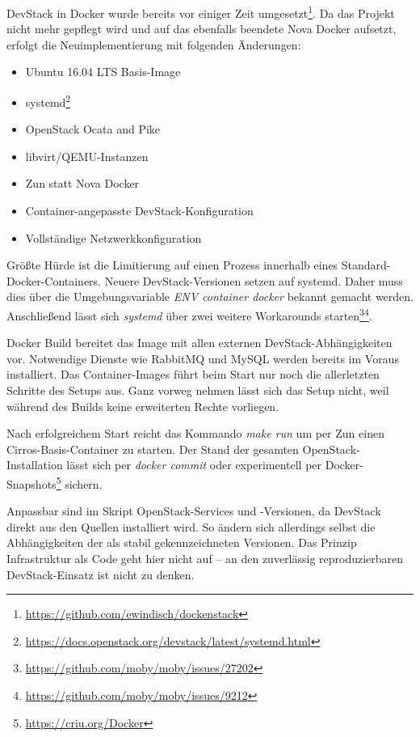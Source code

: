 \noindent DevStack in Docker wurde bereits vor einiger Zeit umgesetzt\footnote{\url{https://github.com/ewindisch/dockenstack}}. Da das Projekt nicht mehr gepflegt wird und auf das ebenfalls beendete Nova Docker aufsetzt, erfolgt die Neuimplementierung mit folgenden Änderungen:

\begin{itemize}
	
	\item Ubuntu 16.04 LTS Basis-Image
	\item systemd\footnote{\url{https://docs.openstack.org/devstack/latest/systemd.html}}
	\item OpenStack Ocata and Pike
	\item libvirt/QEMU-Instanzen
	\item Zun statt Nova Docker
	\item Container-angepasste DevStack-Konfiguration
	\item Vollständige Netzwerkkonfiguration
	
\end{itemize}


\noindent Größte Hürde ist die Limitierung auf einen Prozess innerhalb eines Standard-Docker-Containers. Neuere DevStack-Versionen setzen auf systemd. Daher muss dies über die Umgebungsvariable \emph{ENV container docker} bekannt gemacht werden. Anschließend lässt sich \emph{systemd} über zwei weitere Workarounds starten\footnote{\url{https://github.com/moby/moby/issues/27202}}\footnote{\url{https://github.com/moby/moby/issues/9212}}.

Docker Build bereitet das Image mit allen externen DevStack-Abhängigkeiten vor. Notwendige Dienste wie RabbitMQ und MySQL werden bereits im Voraus installiert. Das Container-Images führt beim Start nur noch die allerletzten Schritte des Setups aus. Ganz vorweg nehmen lässt sich das Setup nicht, weil während des Builds keine erweiterten Rechte vorliegen.

Nach erfolgreichem Start reicht das Kommando \emph{make run} um per Zun einen Cirros-Basis-Container zu starten. Der Stand der gesamten OpenStack-Installation lässt sich per \emph{docker commit} oder experimentell per Docker-Snapshots\footnote{\url{https://criu.org/Docker}} sichern.

Anpassbar sind im Skript OpenStack-Services und -Versionen, da DevStack direkt aus den Quellen installiert wird. So ändern sich allerdings selbst die Abhängigkeiten der als stabil gekennzeichneten Versionen. Das Prinzip Infrastruktur als Code geht hier nicht auf -- an den zuverlässig reproduzierbaren DevStack-Einsatz ist nicht zu denken. 

